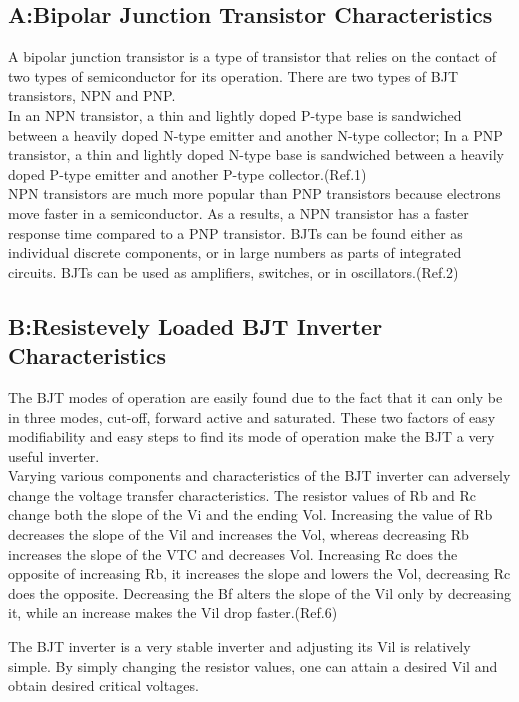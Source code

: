 \documentclass{article}
\begin{document}
\subsection{A:Bipolar Junction Transistor Characteristics}
A bipolar junction transistor is a type of transistor that relies on the contact of two types of semiconductor for its operation. There are two types of BJT transistors, NPN and PNP.\\
In an NPN transistor, a thin and lightly doped P-type base is sandwiched between a heavily doped N-type emitter and another N-type collector;
 In a PNP transistor, a thin and lightly doped N-type base is sandwiched between a heavily doped P-type emitter and another P-type collector.(Ref.1)\\
NPN transistors are much more
popular than PNP transistors because electrons move faster in a semiconductor. As a results,
a NPN transistor has a faster response time compared to a PNP transistor.
BJTs can be found either as individual discrete components, or in large numbers as parts of integrated circuits. BJTs can be used as amplifiers, switches, or in oscillators.(Ref.2)\\



\subsection{B:Resistevely Loaded BJT Inverter Characteristics}
The BJT modes of operation are easily found due to the fact that it can only be in three modes, cut-off, forward active and saturated. These two factors of easy modifiability and easy steps to find its mode of operation make the BJT a very useful inverter.\\

Varying various components and characteristics of the BJT inverter can adversely change the voltage transfer characteristics. The resistor values of Rb and Rc change both the slope of the Vi and the ending Vol. Increasing the value of Rb decreases the slope of the Vil and increases the Vol, whereas decreasing Rb increases the slope of the VTC and decreases Vol. Increasing Rc does the opposite of increasing Rb, it increases the slope and lowers the Vol, decreasing Rc does the opposite. Decreasing the Bf alters the slope of the Vil only by decreasing it, while an increase makes the Vil drop faster.(Ref.6)

The BJT inverter is a very stable inverter and adjusting its Vil is relatively simple. By simply changing the resistor values, one can attain a desired Vil and obtain desired critical voltages. 
\end{document}

